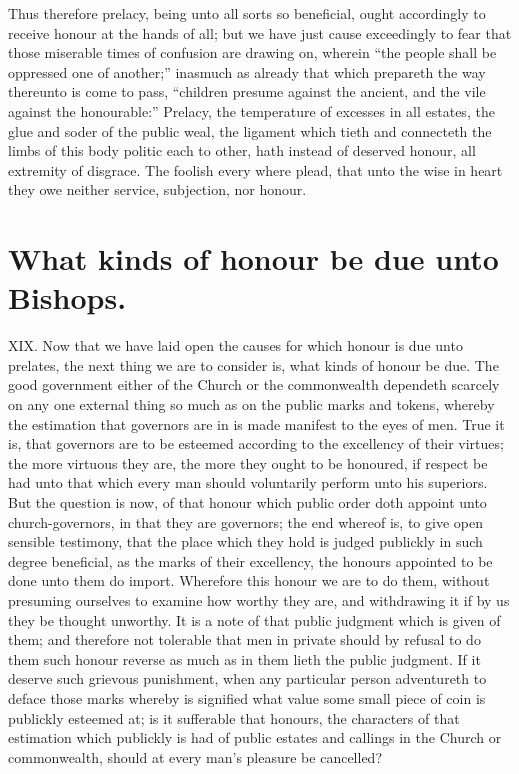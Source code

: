 Thus therefore prelacy, being unto all sorts so beneficial, ought accordingly to receive honour at the hands of all; but we have just cause exceedingly to fear that those miserable times of confusion are drawing on, wherein “the people shall be oppressed one of another;” inasmuch as already that which prepareth the way thereunto is come to pass, “children presume against the ancient, and the vile against the honourable:” Prelacy, the temperature of excesses in all estates, the glue and soder of the public weal, the ligament which tieth and connecteth the limbs of this body politic each to other, hath instead of deserved honour, all extremity of disgrace. The foolish every where plead, that unto the wise in heart they owe neither service, subjection, nor honour.

\section*{What kinds of honour be due unto Bishops.}

XIX. Now that we have laid open the causes for which honour is due unto prelates, the next thing we are to consider is, what kinds of honour be due. The good government either of the Church or the commonwealth dependeth scarcely on any one external thing so much as on the public marks and tokens, whereby the estimation that governors are in is made manifest to the eyes of men. True it is, that governors are to be esteemed according to the excellency of their virtues; the more virtuous they are, the more they ought to be honoured, if respect be had unto that which every man should voluntarily perform unto his superiors. But the question is now, of that honour which public order doth appoint unto church-governors, in that they are governors; the end whereof is, to give open sensible testimony, that the place which they hold is judged publickly in such degree beneficial, as the marks of their excellency, the honours appointed to be done unto them do import. Wherefore this honour we are to do them, without presuming ourselves to examine how worthy they are, and withdrawing it if by us they be thought unworthy. It is a note of that public judgment which is given of them; and therefore not tolerable that men in private should by refusal to do them such honour reverse as much as in them lieth the public judgment. If it deserve such grievous punishment, when any particular person adventureth to deface those marks whereby is signified what  value some small piece of coin is publickly esteemed at; is it sufferable that honours, the characters of that estimation which publickly is had of public estates and callings in the Church or commonwealth, should at every man’s pleasure be cancelled?

